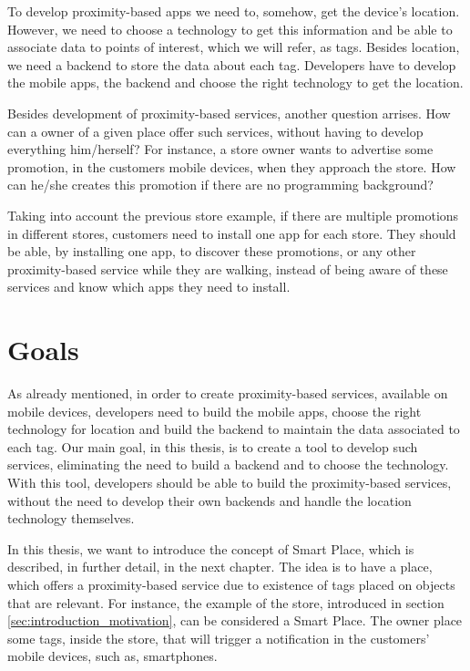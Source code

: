 To develop proximity-based apps we need to, somehow, get the device's location.
However, we need to choose a technology to get this information and be able to associate data to points of interest, which we will refer, as tags.
Besides location, we need a backend to store the data about each tag.
Developers have to develop the mobile apps, the backend and choose the right technology to get the location.

Besides development of proximity-based services, another question arrises.
How can a owner of a given place offer such services, without having to develop everything him/herself?
For instance, a store owner wants to advertise some promotion, in the customers mobile devices, when they approach the store.
How can he/she creates this promotion if there are no programming background?

Taking into account the previous store example, if there are multiple promotions in different stores, customers need to install one app for each store.
They should be able, by installing one app, to discover these promotions, or any other proximity-based service while they are walking, instead of being aware of these services and know which apps they need to install.

\section{Goals}
\label{sec:introduction_goals}
As already mentioned, in order to create proximity-based services, available on mobile devices, developers need to build the mobile apps, choose the right technology for location and build the backend to maintain the data associated to each tag.
Our main goal, in this thesis, is to create a tool to develop such services, eliminating the need to build a backend and to choose the technology.
With this tool, developers should be able to build the proximity-based services, without the need to develop their own backends and handle the location technology themselves.

In this thesis, we want to introduce the concept of Smart Place, which is described, in further detail, in the next chapter.
The idea is to have a place, which offers a proximity-based service due to existence of tags placed on objects that are relevant.
For instance, the example of the store, introduced in section \ref{sec:introduction_motivation}, can be considered a Smart Place.
The owner place some tags, inside the store, that will trigger a notification in the customers' mobile devices, such as, smartphones.

